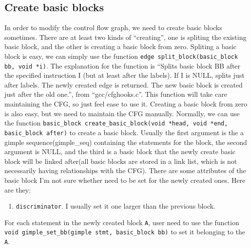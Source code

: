 \documentclass[11pt]{article}
\begin{document}
\subsection{Create basic blocks}
In order to modify the control flow graph, we need to create basic blocks sometimes. There are at least two kinds of ``creating'', one is spliting the existing basic block, and the other is creating a basic block from zero. Spliting a basic block is easy, we can simply use the function \texttt{edge split\_block(basic\_block bb, void *i)}. The explanation for the function is ``Splits basic block BB after the specified instruction I (but at least after the labels).  If I is NULL, splits just after labels.  The newly created edge is returned.  The new basic block is created just after the old one.'', from ``gcc/cfghooks.c''. This function will take care maintaining the CFG, so just feel ease to use it. Creating a basic block from zero is also easy, but we need to maintain the CFG manually. Normally, we can use the function \texttt{basic\_block create\_basic\_block(void *head, void *end, basic\_block after)} to create a basic block. Usually the first argument is the a gimple sequence(gimple\_seq) containing the statements for the block, the second argument is NULL, and the third is a basic block that the newly create basic block will be linked after(all basic blocks are stored in a link list, which is not necessarily having relationships with the CFG). There are some attributes of the basic block I'm not sure whether need to be set for the newly created ones. Here are they: 
\begin{enumerate}
\item \texttt{discriminator}. I usually set it one larger than the previous block.
\end{enumerate}

For each statement in the newly created block \texttt{A}, user need to use the function \texttt{void gimple\_set\_bb(gimple stmt, basic\_block bb)} to set it belonging to the \texttt{A}.
\end{document}
